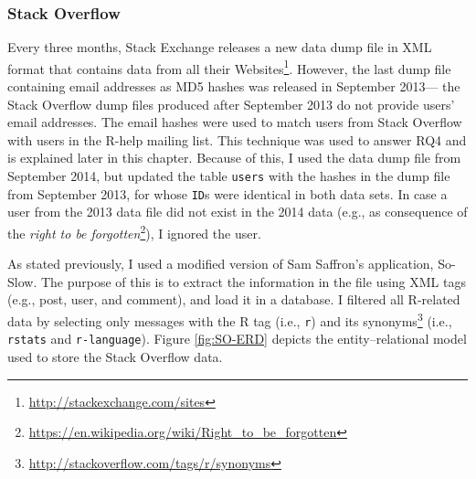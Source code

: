 \documentclass{sig-alternate-05-2015}
\begin{document}
\subsubsection*{Stack Overflow}
	Every three months, Stack Exchange releases a new data dump file in XML format that contains data from all their Websites\footnote{\url{http://stackexchange.com/sites}}.
	However, the last dump file containing email addresses as MD5 hashes was released in September 2013--- 
	the Stack Overflow dump files produced after September 2013 do not provide users' email addresses.
	The email hashes were used to match users from Stack Overflow with users in the R-help mailing list. 
	This technique was used to answer RQ4 and is explained later in this chapter.
	Because of this, I used the data dump file from September 2014, but updated the table \texttt{users} with the hashes in the dump file from September 2013, for whose \texttt{ID}s were identical in both data sets.
	In case a user from the 2013 data file did not exist in the 2014 data (e.g., as consequence of the \textit{right to be forgotten}\footnote{\url{https://en.wikipedia.org/wiki/Right\_to\_be\_forgotten}}), I ignored the user.

	As stated previously, I used a modified version of Sam Saffron's application, So-Slow.
	The purpose of this is to extract the information in the file using XML tags (e.g., post, user, and comment), and load it in a database.
	I filtered all R-related data by selecting only messages with the R tag (i.e., \texttt{r}) and its synonyms\footnote{\url{http://stackoverflow.com/tags/r/synonyms}} (i.e., \texttt{rstats} and \texttt{r-language}).
	Figure \ref{fig:SO-ERD} depicts the entity--relational model used to store the Stack Overflow data.
\end{document}
